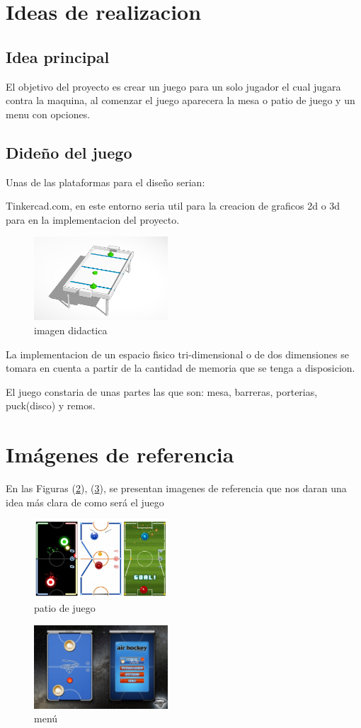 \documentclass{article}
\begin{document}
\section{Ideas de realizacion}
\label{contenido}
\subsection{Idea principal}

El objetivo del proyecto es crear un juego para un solo jugador el cual jugara contra la maquina, al comenzar el juego aparecera la mesa o patio de juego y un menu con opciones.

\subsection{Dideño del juego}
Unas de las plataformas para el diseño serian: 

Tinkercad.com, en este entorno seria util para la creacion de graficos 2d o 3d para en la implementacion del proyecto.

\begin{figure}[h]
\includegraphics[width=5cm]{plantilla_latex/imagenes/tinkercad_1.png}
\centering
\caption{imagen didactica}
\label{fig:cpplogo}
\end{figure}
La implementacion de un espacio fisico tri-dimensional o de dos dimensiones se tomara en cuenta a partir de la cantidad de memoria que se tenga a disposicion.


El juego constaria de unas partes las que son: mesa, barreras, porterias, puck(disco) y remos.

\section{ Imágenes de referencia} \label{imagenes}

En las Figuras (\ref{fig:Air-Hockey}), (\ref{fig:air-menu}), se   presentan imagenes de referencia que nos daran una idea más clara de como será el juego

\label{imagenes}
\begin{figure}[h]
\includegraphics[width=5cm]{plantilla_latex/imagenes/Air-Hockey.png}
\centering
\caption{patio de juego}
\label{fig:Air-Hockey}
\end{figure}


\label{imagenes}
\begin{figure}[h]
\includegraphics[width=5cm]{plantilla_latex/imagenes/air-menu.jpg}
\centering
\caption{ menú}
\label{fig:air-menu}
\end{figure}
\end{document}
